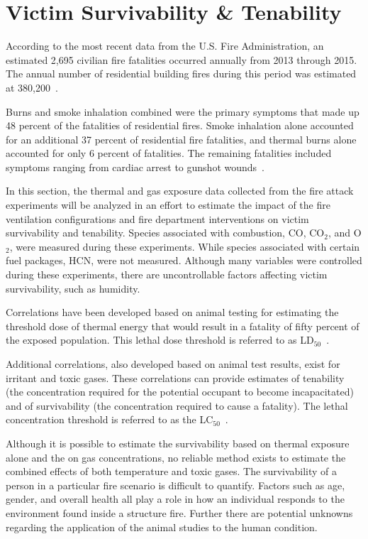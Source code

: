 \documentclass[12pt,oneside]{book}
\begin{document}
\section{Victim Survivability \& Tenability}

According to the most recent data from the U.S. Fire Administration, an estimated 2,695 civilian fire fatalities occurred annually from 2013 through 2015.  The annual number of residential building fires during this period was estimated at 380,200~\cite{USFA_Fire_Fatalities}.

Burns and smoke inhalation combined were the primary symptoms that made up 48 percent of the fatalities of residential fires.  Smoke inhalation alone accounted for an additional 37 percent of residential fire fatalities, and thermal burns alone accounted for only 6 percent of fatalities.  The remaining fatalities included symptoms ranging from cardiac arrest to gunshot wounds~\cite{USFA_Fire_Fatalities}.

In this section, the thermal and gas exposure data collected from the fire attack experiments will be analyzed in an effort to estimate the impact of the fire ventilation configurations and fire department interventions on victim survivability and tenability. Species associated with combustion, CO, CO$_{2}$, and O$_{2}$, were measured during these experiments. While species associated with certain fuel packages, HCN, were not measured. Although many variables were controlled during these experiments, there are uncontrollable factors affecting victim survivability, such as humidity.

Correlations have been developed based on animal testing for estimating the threshold dose of thermal energy that would result in a fatality of fifty percent of the exposed population.  This lethal dose threshold is referred to as LD$_{50}$~\cite{SFPE:Purser}.  

Additional correlations, also developed based on animal test results, exist for irritant and toxic gases.  These correlations can provide estimates of tenability (the concentration required for the potential occupant to become incapacitated) and of survivability (the concentration required to cause a fatality). The lethal concentration threshold is referred to as the LC$_{50}$~\cite{SFPE:Purser}.

Although it is possible to estimate the survivability based on thermal exposure alone and the on gas concentrations, no reliable method exists to estimate the combined effects of both temperature and toxic gases. The survivability of a person in a particular fire scenario is difficult to quantify. Factors such as age, gender, and overall health all play a role in how an individual responds to the environment found inside a structure fire.  Further there are potential unknowns regarding the application of the animal studies to the human condition. 
\end{document}
